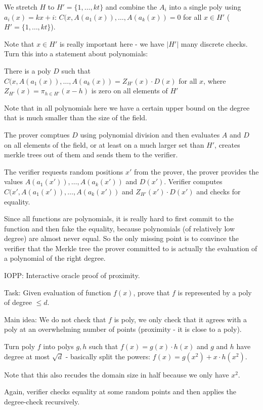 \documentclass[11pt,letterpaper]{article}
\begin{document}
We stretch $H$ to $H'=\{1,\dots,kt\}$ and combine the $A_i$ into a single poly using $a_i(x) = kx+i$:
$C(x, A(a_1(x)), \dots, A(a_k(x)) = 0$ for all $x \in H'$ ($H' = \{1,\dots, kt\}$).

Note that $x \in H'$ is really important here - we have $|H'|$ many discrete checks.
Turn this into a statement about polynomials:

There is a poly $D$ such that
$C(x, A(a_1(x)), \dots, A(a_k(x)) = Z_{H'}(x) \cdot D(x)$ for all $x$, where
$Z_{H'}(x) = \pi_{h \in H'}(x-h)$ is zero on all elements of $H'$

Note that in all polynomials here we have a certain upper bound on the degree that is much
smaller than the size of the field.

The prover comptues $D$ using polynomial division and then evaluates $A$ and $D$
on all elements of the field, or
at least on a much larger set than $H'$, creates merkle trees out of them and sends
them to the verifier.

The verifier requests random positions $x'$ from the prover, the prover provides the values
$A(a_1(x')), \dots, A(a_k(x'))$ and $D(x')$. Verifier computes
$C(x', A(a_1(x')), \dots, A(a_k(x'))$ and $Z_{H'}(x') \cdot D(x')$ and checks for equality.

Since all functions are polynomials, it is really hard to first commit to the function
and then fake the equality, because polynomials (of relatively low degree) are almost
never equal. So the only missing point is to convince the verifier that the
Merkle tree the prover committed to is actually the evaluation of a polynomial of the
right degree.

IOPP: Interactive oracle proof of proximity.

Task: Given evaluation of function $f(x)$, prove that $f$ is represented by a
poly of degree $\le d$.

Main idea: We do not check that $f$ is poly, we only check that it agrees with a
poly at an overwhelming number of points (proximity - it is close to a poly).

Turn poly $f$ into polys $g,h$ such that $f(x) = g(x)\cdot h(x)$ and $g$ and $h$
have degree at most $\sqrt{d}$ - basically split the powers: $f(x) = g(x^2) + x \cdot h(x^2)$.

Note that this also recudes the domain size in half because we only have $x^2$.

Again, verifier checks equality at some random points and then applies the degree-check recursively.
\end{document}
